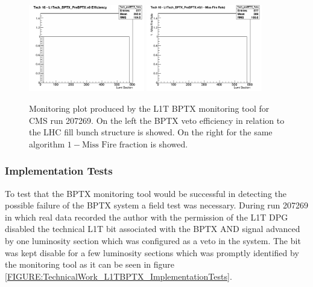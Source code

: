 \begin{figure}[!htb]
\centering
\includegraphics[width=0.45\textwidth]{Chapter03/L1TOnline/Images/L1TDQM_Online_Run207269_L1TBPTX_Efficiency_Tech_preBPTX_Veto.png}
\includegraphics[width=0.45\textwidth]{Chapter03/L1TOnline/Images/L1TDQM_Online_Run207269_L1TBPTX_MissFire_Tech_preBPTX_Veto.png}
\caption{Monitoring plot produced by the \gls{L1T} \gls{BPTX} monitoring tool for \gls{CMS} run 207269. On the left the \gls{BPTX} veto efficiency in relation to the \gls{LHC} fill bunch structure is showed. On the right for the same algorithm $1 - \text{Miss Fire fraction}$ is showed.}
\label{FIGURE:TechnicalWork_BPTXMonitoring}
\end{figure}

\subsubsection{Implementation Tests}


To test that the \gls{BPTX} monitoring tool would be successful in detecting the possible failure of the \gls{BPTX} system a field test was necessary. During run 207269 in which real data recorded the author with the permission of the \gls{L1T} \gls{DPG} disabled the technical \gls{L1T} bit associated with the \gls{BPTX} AND signal advanced by one luminosity section which was configured as a veto in the system. The bit was kept disable for a few luminosity sections which was promptly identified by the monitoring tool as it can be seen in figure \ref{FIGURE:TechnicalWork_L1TBPTX_ImplementationTests}.

